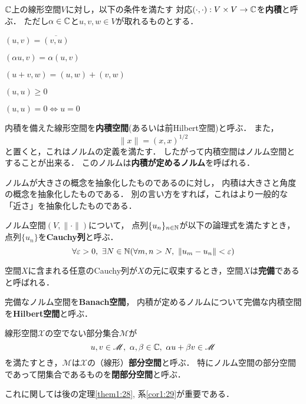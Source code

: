 \documentclass[a4j]{jarticle}
\newcommand{\spX}{\mathscr{X}}
\begin{document}
        \begin{Def}
            $\mathbb{C}$上の線形空間$V$に対し，以下の条件を満たす
            対応$(\cdot, \cdot): V \times V \to \mathbb{C} $を\textbf{内積}と呼ぶ．
            ただし$\alpha \in \mathbb{C}$と$u, v, w \in V$が取れるものとする．
            \begin{description}
                \setlength{\leftskip}{0.5truecm}
                \item[I1] $(u,v)=\overline{(v,u)}$
                \item[I2] $(\alpha u, v) =\alpha (u,v)$
                \item[I4] $(u+v,w)=(u,w)+(v,w)$
                \item[I5] $(u,u) \geq 0$
                \item[I6] $(u,u)=0 \iff u=0$
            \end{description}
            内積を備えた線形空間を\textbf{内積空間}(あるいは前Hilbert空間)と呼ぶ．
            また，\[ \|x\|=(x,x)^{1/2} \]と置くと，これはノルムの定義を満たす．
            したがって内積空間はノルム空間とすることが出来る．
            このノルムは\textbf{内積が定めるノルム}を呼ばれる．
        \end{Def}
        ノルムが大きさの概念を抽象化したものであるのに対し，
        内積は大きさと角度の概念を抽象化したものである．
        別の言い方をすれば，これはより一般的な「近さ」を抽象化したものである．

        \begin{Def}
            ノルム空間$(V, \| \cdot \|)$について，
            点列$\{ u_n \}_{n \in \mathbb{N}}$が以下の論理式を満たすとき，
            点列$\{ u_n \}$を\textbf{Cauchy列}と呼ぶ．
            \[ \forall \varepsilon>0,~ \exists N \in \mathbb{N} (\forall m,n>N,~ \| u_m-u_n \|<\varepsilon) \]
        \end{Def}

        \begin{Def}
            空間$X$に含まれる任意のCauchy列が$X$の元に収束するとき，空間$X$は\textbf{完備}であると呼ばれる．
        \end{Def}

        \begin{Def}
            完備なノルム空間を\textbf{Banach空間}，
            内積が定めるノルムについて完備な内積空間を\textbf{Hilbert空間}と呼ぶ．
        \end{Def}

        \begin{Def}
            線形空間$\spX$の空でない部分集合$\mathscr{M}$が
            \[ u, v \in \mathscr{M},~ \alpha, \beta \in \mathbb{C},~ \alpha u+ \beta v \in \mathscr{M} \]
            を満たすとき，$\mathscr{M}$は$\spX$の（線形）\textbf{部分空間}と呼ぶ．
            特にノルム空間の部分空間であって閉集合であるものを\textbf{閉部分空間}と呼ぶ．
        \end{Def}
        これに関しては後の定理\ref{them1:28}, 系\ref{cor1:29}が重要である．
\end{document}
